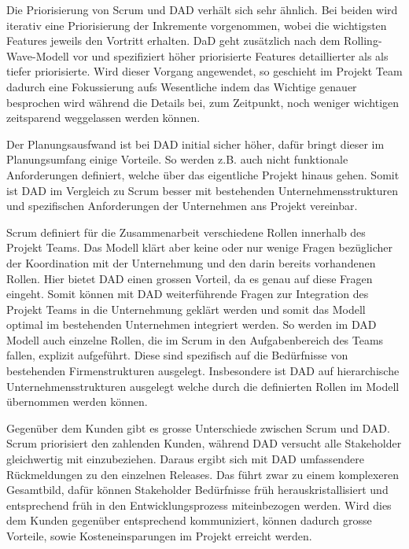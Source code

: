 Die Priorisierung von Scrum und DAD verhält sich sehr ähnlich. Bei beiden wird iterativ eine Priorisierung der Inkremente vorgenommen, wobei die wichtigsten Features jeweils den Vortritt erhalten. DaD geht zusätzlich nach dem Rolling-Wave-Modell vor und spezifiziert höher priorisierte Features detaillierter als als tiefer priorisierte. Wird dieser Vorgang angewendet, so geschieht im Projekt Team dadurch eine Fokussierung aufs Wesentliche indem das Wichtige genauer besprochen wird während die Details bei, zum Zeitpunkt, noch weniger wichtigen zeitsparend weggelassen werden können.

Der Planungsausfwand ist bei DAD initial sicher höher, dafür bringt dieser im Planungsumfang einige Vorteile. So werden z.B. auch nicht funktionale Anforderungen definiert, welche über das eigentliche Projekt hinaus gehen. Somit ist DAD im Vergleich zu Scrum besser mit bestehenden Unternehmensstrukturen und spezifischen Anforderungen der Unternehmen ans Projekt vereinbar. \newline

Scrum definiert für die Zusammenarbeit verschiedene Rollen innerhalb des Projekt Teams. Das Modell klärt aber keine oder nur wenige Fragen bezüglicher der Koordination mit der Unternehmung und den darin bereits vorhandenen Rollen. Hier bietet DAD einen grossen Vorteil, da es genau auf diese Fragen eingeht. Somit können mit DAD weiterführende Fragen zur Integration des Projekt Teams in die Unternehmung geklärt werden und somit das Modell optimal im bestehenden Unternehmen integriert werden. So werden im DAD Modell auch einzelne Rollen, die im Scrum in den Aufgabenbereich des Teams fallen, explizit aufgeführt. Diese sind spezifisch auf die Bedürfnisse von bestehenden Firmenstrukturen ausgelegt. Insbesondere ist DAD auf hierarchische Unternehmensstrukturen ausgelegt welche durch die definierten Rollen im Modell übernommen werden können.\newline

Gegenüber dem Kunden gibt es grosse Unterschiede zwischen Scrum und DAD. Scrum priorisiert den zahlenden Kunden, während DAD versucht alle Stakeholder gleichwertig mit einzubeziehen. Daraus ergibt sich mit DAD umfassendere Rückmeldungen zu den einzelnen Releases. Das führt zwar zu einem komplexeren Gesamtbild, dafür können Stakeholder Bedürfnisse früh herauskristallisiert und entsprechend früh in den Entwicklungsprozess miteinbezogen werden. Wird dies dem Kunden gegenüber entsprechend kommuniziert, können dadurch grosse Vorteile, sowie Kosteneinsparungen im Projekt erreicht werden. 

